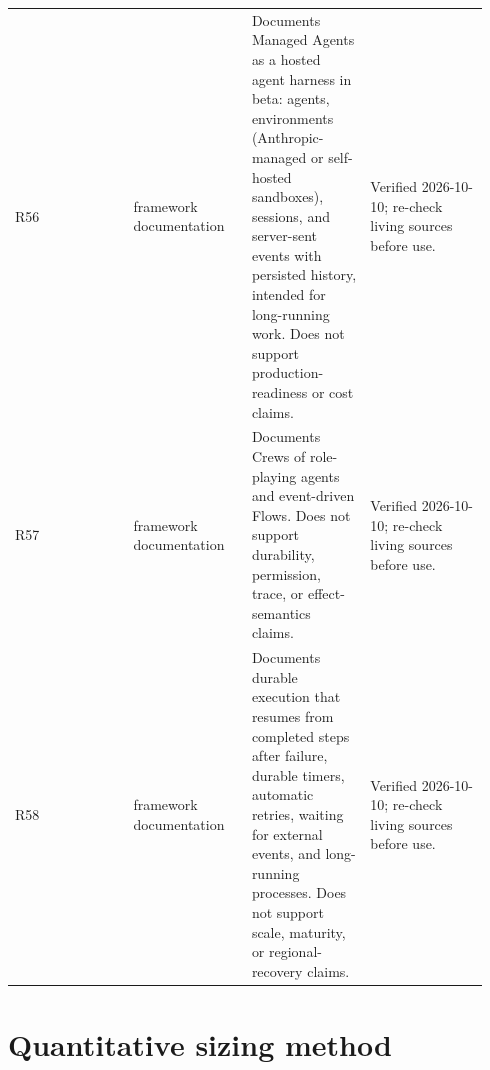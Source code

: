 \begin{longtable}{@{}Y{0.2350\linewidth}Y{0.2350\linewidth}Y{0.2350\linewidth}Y{0.2350\linewidth}@{}}
R56 & framework documentation & Documents Managed Agents as a hosted agent harness in beta: agents, environments (Anthropic-managed or self-hosted sandboxes), sessions, and server-sent events with persisted history, intended for long-running work. Does not support production-readiness or cost claims. & Verified 2026-10-10; re-check living sources before use. \\
R57 & framework documentation & Documents Crews of role-playing agents and event-driven Flows. Does not support durability, permission, trace, or effect-semantics claims. & Verified 2026-10-10; re-check living sources before use. \\
R58 & framework documentation & Documents durable execution that resumes from completed steps after failure, durable timers, automatic retries, waiting for external events, and long-running processes. Does not support scale, maturity, or regional-recovery claims. & Verified 2026-10-10; re-check living sources before use. \\
\end{longtable}
\BookTableEnd


\section{Quantitative sizing method}

